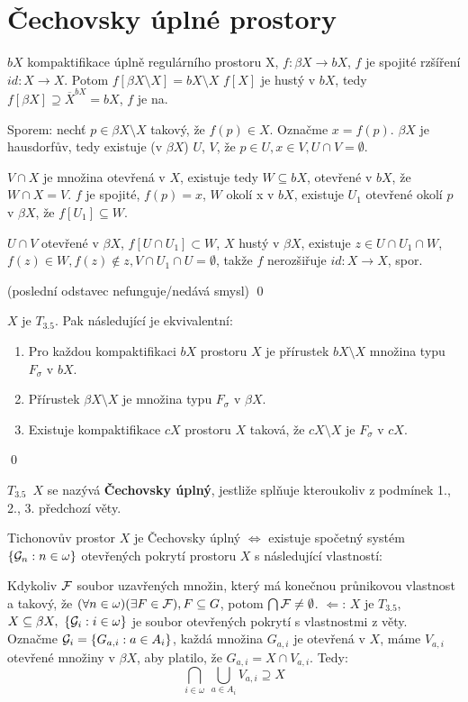 \documentclass[12pt,a4paper]{article}
\newcommand\BX{$\beta X$}
\newcommand\Tich{$T_{3.5}$}
\newcommand\close{\overline}
\begin{document}
\section{Čechovsky úplné prostory}
\lemma
	$bX$ kompaktifikace úplně regulárního prostoru X, $f: \beta X \to
	bX$, $f$ je spojité rzšíření $id: X \to X$. Potom $f[\beta
	X\setminus X] = bX \setminus X$
\dukaz
	$f[X]$ je hustý v $bX$, tedy $f[\beta X] \supseteq \close X^{bX} = bX$,
	$f$ je na.

	Sporem: nechť $p \in \beta X \setminus X$ takový, že $f(p) \in
	X$. Označme $x = f(p)$. $\beta X$ je hausdorfův, tedy existuje (v $\beta
	X$) $U$, $V$, že $p \in U, x \in V, U \cap V = \emptyset$.

	$V \cap X$ je množina otevřená v $X$, existuje tedy $W \subseteq bX$,
	otevřené v $bX$, že $W \cap X = V$. $f$ je spojité, $f(p) = x$, $W$ okolí x
	v $bX$, existuje $U_1$ otevřené okolí $p$ v $\beta X$, že $f[U_1] \subseteq
	W$.
	
	$U \cap V$ otevřené v \BX, $f[U \cap U_1] \subset W$, $X$ hustý v
	$\beta X$, existuje $z \in U \cap U_1 \cap W$, $f(z) \in W, f(z) \notin z,
	V \cap U_1 \cap U = \emptyset$, takže $f$ nerozšiřuje $id: X \to
	X$, spor.

	(poslední odstavec nefunguje/nedává smysl)
	\qed

\veta $X$ je \Tich. Pak následující je ekvivalentní:
\begin{enumerate}
	\item Pro každou kompaktifikaci $bX$ prostoru $X$ je přírustek $bX
		\setminus X$ množina typu $F_\sigma$ v $bX$.
	\item Přírustek $\beta X \setminus X$ je množina typu $F_\sigma$ v $\beta X$.
	\item Existuje kompaktifikace $cX$ prostoru $X$ taková, že $cX \setminus X$
		je $F_\sigma$ v $cX$.
\end{enumerate}

\dukaz
	\qed

 \Tich~$X$ se nazývá {\bf Čechovsky úplný}, jestliže splňuje
	kteroukoliv z podmínek 1., 2., 3. předchozí věty.

\veta Tichonovův prostor $X$ je Čechovsky úplný $\iff$ existuje spočetný systém
	$\{\mathcal{ G }_n: n \in \omega\}$ otevřených pokrytí prostoru $X$ s následující
	vlastností:

	Kdykoliv $\mathcal{ F }$ soubor uzavřených množin, který má konečnou průnikovou
	vlastnost a takový, že $(\forall n \in \omega) (\exists F \in \mathcal{ F }), F
	\subseteq G$, potom $\bigcap \mathcal{ F } \neq \emptyset$.
\dukaz
\noindent$\Leftarrow$: $X$ je \Tich,~$X \subseteq \beta X,~\{\mathcal{ G }_i : i \in
	\omega \}$ je soubor otevřených pokrytí s vlastnostmi z věty. Označme $\mathcal{ G }_i = \{G_{a,i} : a \in A_i\}$, každá množina $G_{a,i}$ je otevřená v $X$,
	máme $V_{a,i}$ otevřené množiny v \BX, aby platilo, že $G_{a,i} = X \cap
	V_{a,i}$. Tedy:
		$$\bigcap_{i \in \omega}~\bigcup_{a \in A_i} V_{a,i} \supseteq X$$
	
\end{document}
